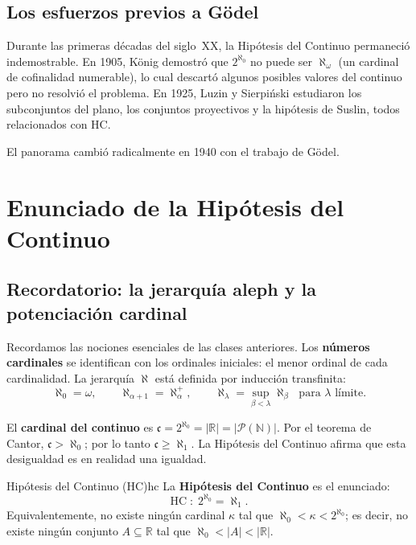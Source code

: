 \subsection{Los esfuerzos previos a Gödel}

Durante las primeras décadas del siglo~XX, la Hipótesis del Continuo permaneció indemostrable. En 1905, König demostró que $2^{\aleph_0}$ no puede ser $\aleph_\omega$ (un cardinal de cofinalidad numerable), lo cual descartó algunos posibles valores del continuo pero no resolvió el problema. En 1925, Luzin y Sierpi\'nski estudiaron los subconjuntos del plano, los conjuntos proyectivos y la hipótesis de Suslin, todos relacionados con HC.

El panorama cambió radicalmente en 1940 con el trabajo de Gödel.

\section{Enunciado de la Hipótesis del Continuo}

\subsection{Recordatorio: la jerarquía aleph y la potenciación cardinal}

Recordamos las nociones esenciales de las clases anteriores. Los \textbf{números cardinales} se identifican con los ordinales iniciales: el menor ordinal de cada cardinalidad. La jerarquía $\aleph$ está definida por inducción transfinita:
\[
  \aleph_0 = \omega, \qquad
  \aleph_{\alpha+1} = \aleph_\alpha^+, \qquad
  \aleph_\lambda = \sup_{\beta < \lambda} \aleph_\beta \;\text{ para } \lambda \text{ límite}.
\]

El \textbf{cardinal del continuo} es $\mathfrak{c} = 2^{\aleph_0} = |\mathbb{R}| = |\mathcal{P}(\mathbb{N})|$. Por el teorema de Cantor, $\mathfrak{c} > \aleph_0$; por lo tanto $\mathfrak{c} \geq \aleph_1$. La Hipótesis del Continuo afirma que esta desigualdad es en realidad una igualdad.

\begin{definicion}{Hipótesis del Continuo (HC)}{hc}
La \textbf{Hipótesis del Continuo} es el enunciado:
\[
  \mathrm{HC} \;:\; 2^{\aleph_0} = \aleph_1.
\]
Equivalentemente, no existe ningún cardinal $\kappa$ tal que $\aleph_0 < \kappa < 2^{\aleph_0}$; es decir, no existe ningún conjunto $A \subseteq \mathbb{R}$ tal que $\aleph_0 < |A| < |\mathbb{R}|$.
\end{definicion}

